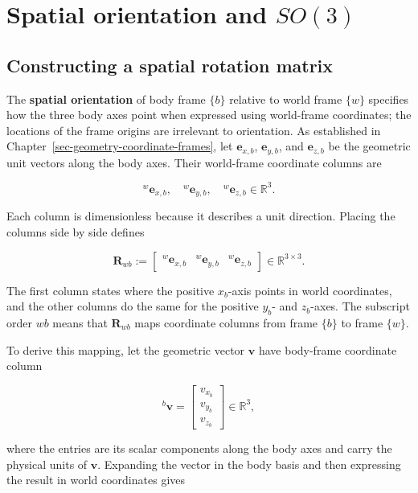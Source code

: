 \documentclass[
  australian,
  12pt,
  letterpaper,
  DIV=11,
  numbers=noendperiod,
  twoside]{scrreprt}
\begin{document}
\section{\texorpdfstring{Spatial orientation and
\(SO(3)\)}{Spatial orientation and SO(3)}}\label{sec-so3-spatial-orientation}

\subsection{Constructing a spatial rotation
matrix}\label{sec-so3-rotation-construction}

The \textbf{spatial orientation} of body frame \(\{b\}\) relative to
world frame \(\{w\}\) specifies how the three body axes point when
expressed using world-frame coordinates; the locations of the frame
origins are irrelevant to orientation. As established in
Chapter~\ref{sec-geometry-coordinate-frames}, let \(\mathbf e_{x,b}\),
\(\mathbf e_{y,b}\), and \(\mathbf e_{z,b}\) be the geometric unit
vectors along the body axes. Their world-frame coordinate columns are

\[
{}^{w}\mathbf e_{x,b},
\quad
{}^{w}\mathbf e_{y,b},
\quad
{}^{w}\mathbf e_{z,b}
\in\mathbb R^3.
\]

Each column is dimensionless because it describes a unit direction.
Placing the columns side by side defines

\[
\boxed{
\mathbf R_{wb}
\mathrel{:=}
\begin{bmatrix}
{}^{w}\mathbf e_{x,b}&
{}^{w}\mathbf e_{y,b}&
{}^{w}\mathbf e_{z,b}
\end{bmatrix}
\in\mathbb R^{3\times3}
}.
\]

The first column states where the positive \(x_b\)-axis points in world
coordinates, and the other columns do the same for the positive \(y_b\)-
and \(z_b\)-axes. The subscript order \(wb\) means that
\(\mathbf R_{wb}\) maps coordinate columns from frame \(\{b\}\) to frame
\(\{w\}\).

To derive this mapping, let the geometric vector \(\mathbf v\) have
body-frame coordinate column

\[
{}^{b}\mathbf v
=
\begin{bmatrix}
v_{x_b}\\
v_{y_b}\\
v_{z_b}
\end{bmatrix}
\in\mathbb R^3,
\]

where the entries are its scalar components along the body axes and
carry the physical units of \(\mathbf v\). Expanding the vector in the
body basis and then expressing the result in world coordinates gives
\end{document}
